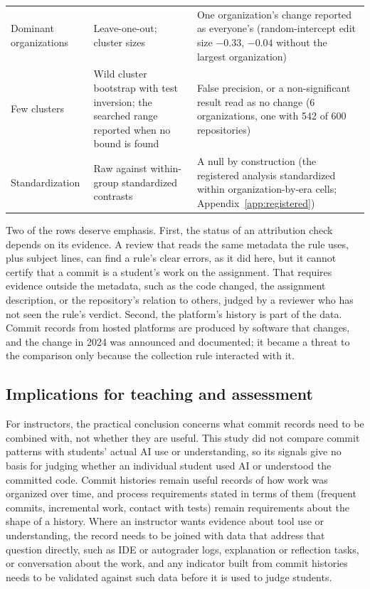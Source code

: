 \documentclass[acmsmall,screen,review,anonymous]{acmart}
\begin{document}
\begin{table}
\begin{tabular}{@{}>{\raggedright\arraybackslash}p{2.5cm} >{\raggedright\arraybackslash}p{3.6cm} >{\raggedright\arraybackslash}p{6.4cm}@{}}
Dominant organizations & Leave-one-out; cluster sizes & One organization's change reported as everyone's (random-intercept edit size $-0.33$, $-0.04$ without the largest organization) \\
Few clusters & Wild cluster bootstrap with test inversion; the searched range reported when no bound is found & False precision, or a non-significant result read as no change (6 organizations, one with 542 of 600 repositories) \\
Standardization & Raw against within-group standardized contrasts & A null by construction (the registered analysis standardized within organization-by-era cells; Appendix~\ref{app:registered}) \\
\bottomrule
\end{tabular}
\end{table}

Two of the rows deserve emphasis. First, the status of an attribution check depends on its evidence. A review that reads the same metadata the rule uses, plus subject lines, can find a rule's clear errors, as it did here, but it cannot certify that a commit is a student's work on the assignment. That requires evidence outside the metadata, such as the code changed, the assignment description, or the repository's relation to others, judged by a reviewer who has not seen the rule's verdict. Second, the platform's history is part of the data. Commit records from hosted platforms are produced by software that changes, and the change in 2024 was announced and documented; it became a threat to the comparison only because the collection rule interacted with it.

\subsection{Implications for teaching and assessment}

For instructors, the practical conclusion concerns what commit records need to be combined with, not whether they are useful. This study did not compare commit patterns with students' actual AI use or understanding, so its signals give no basis for judging whether an individual student used AI or understood the committed code. Commit histories remain useful records of how work was organized over time, and process requirements stated in terms of them (frequent commits, incremental work, contact with tests) remain requirements about the shape of a history. Where an instructor wants evidence about tool use or understanding, the record needs to be joined with data that address that question directly, such as IDE or autograder logs, explanation or reflection tasks, or conversation about the work, and any indicator built from commit histories needs to be validated against such data before it is used to judge students.
\end{document}
